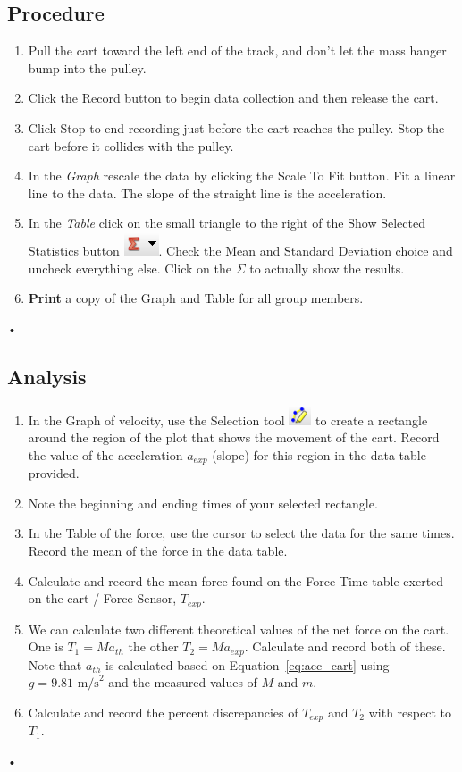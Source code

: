 \documentclass[main.tex]{subfiles}
\begin{document}
\subsection*{Procedure}
\begin{enumerate}
\item
Pull the cart toward the left end of the track, and don't let the mass hanger bump into the pulley.
\item
Click the Record button to begin data collection and then release the cart.
\item
Click Stop to end recording just before the cart reaches the pulley. Stop the cart before it collides with the pulley.
\item
In the \emph{Graph} rescale the data by clicking the Scale To Fit button. Fit a linear line to the data. The slope of the straight line is the acceleration. 
\item
In the \emph{Table} click on the small triangle to the right of the Show Selected Statistics button \includegraphics{Statistics}. Check the Mean and Standard Deviation choice and uncheck everything else. Click on the $\Sigma$ to actually show the results.
\item
\textbf{Print} a copy of the Graph and Table for all group members.
\end{enumerate}•

\subsection*{Analysis}
\begin{enumerate}
\item
In the Graph of velocity, use the Selection tool \includegraphics{Selection_Tool} to create a rectangle around the region of the plot that shows the movement of the cart. Record the value of the acceleration $a_{exp}$ (slope) for this region in the data table provided.
\item
Note the beginning and ending times of your selected rectangle.
\item
In the Table of the force, use the cursor to select the data for the same times. Record the mean of the force in the data table.
\item
Calculate and record the mean force found on the Force-Time table exerted on the cart / Force Sensor, $T_{exp}.$
\item
We can calculate two different theoretical values of the net force on the cart. One is $T_1=Ma_{th}$ the other $T_2=Ma_{exp}.$ Calculate and record both of these. Note that $a_{th}$ is calculated based on Equation~\eqref{eq:acc_cart} using $g=9.81 \text{ m/s}^2$ and the measured values of $M$ and $m.$
\item
Calculate and record the percent discrepancies of $T_{exp}$ and $T_2$ with respect to $T_1.$
\end{enumerate}•
\end{document}
